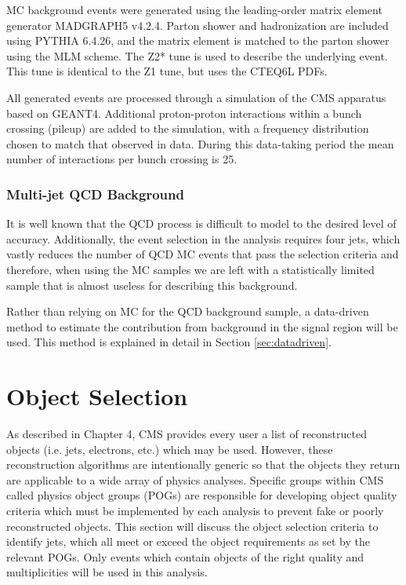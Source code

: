 MC background events were generated using the leading-order matrix element generator MADGRAPH5 v4.2.4. Parton shower and hadronization are included using PYTHIA 6.4.26, and the matrix element is matched to the parton shower using the MLM scheme. The Z2* tune is used to describe the underlying event. This tune is identical to the Z1 tune, but uses the CTEQ6L PDFs.

All generated events are processed through a simulation of the CMS apparatus based on GEANT4. Additional proton-proton interactions within a bunch crossing (pileup) are added to the simulation, with a frequency distribution chosen to match that observed in data. During this data-taking period the mean number of interactions per bunch crossing is 25.

\subsubsection{Multi-jet QCD Background}
It is well known that the QCD process is difficult to model to the desired level of accuracy. Additionally, the event selection in the analysis requires four jets, which vastly reduces the number of QCD MC events that pass the selection criteria and therefore, when using the MC samples we are left with a statistically limited sample that is almost useless for describing this background.

Rather than relying on MC for the QCD background sample, a data-driven method to estimate the contribution from background in the signal region will be used. This method is explained in detail in Section \ref{sec:datadriven}.

\section{Object Selection}

As described in Chapter 4, CMS provides every user a list of reconstructed objects (i.e. jets, electrons, etc.) which may be used. However, these reconstruction algorithms are intentionally generic so that the objects they return are applicable to a wide array of physics analyses. Specific groups within CMS called physics object groups (POGs) are responsible for developing object quality criteria which must be implemented by each analysis to prevent fake or poorly reconstructed objects. This section will discuss the object selection criteria to identify jets, which all meet or exceed the object requirements as set by the relevant POGs. Only events which contain objects of the right quality and multiplicities will be used in this analysis.

